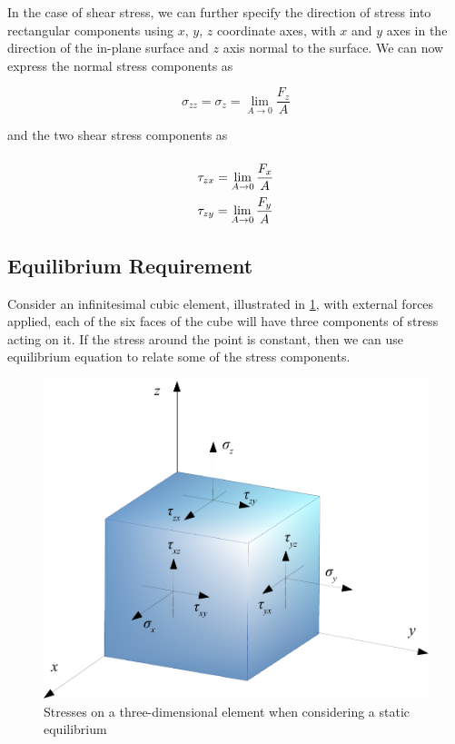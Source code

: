 \documentclass[
10pt,
a4paper,
openany,
svgnames,
]{book}
\begin{document}
In the case of shear stress, we can further specify the direction of stress into rectangular components using $x$, $y$, $z$ coordinate axes, with $x$ and $y$ axes in the direction of the in-plane surface and $z$ axis normal to the surface. We can now express the normal stress components as

\begin{equation}
  \sigma _{zz} = \sigma _z = \mathop {\lim }\limits_{A \to 0} \frac{F_z}{A}
\end{equation}

and the two shear stress components as

\begin{equation}
  \arraycolsep=1.4pt\def\arraystretch{2.2}
  \begin{array}{l}
    \tau _{zx} = \mathop {\lim }\limits_{A \to 0} \dfrac{F_x}{A} \\
    \tau _{zy} = \mathop {\lim }\limits_{A \to 0} \dfrac{F_y}{A}
  \end{array}
\end{equation}

\subsection{Equilibrium Requirement}

Consider an infinitesimal cubic element, illustrated in \cref{fig: 3d-stress-element}, with external forces applied, each of the six faces of the cube will have three components of stress acting on it. If the stress around the point is constant, then we can use equilibrium equation to relate some of the stress components.

\begin{figure}[h]
  \centering
  \includegraphics[scale=0.6]{pictures/Static-body-load-analysis/3d-element-stress}
  \caption{Stresses on a three-dimensional element when considering a static equilibrium}
  \label{fig: 3d-stress-element}
\end{figure}
  
\end{document}
